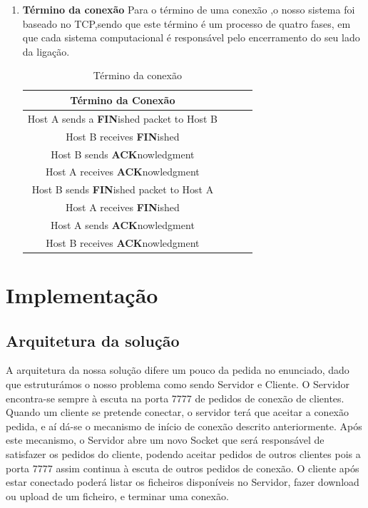 \documentclass{article}
\begin{document}
\begin{enumerate}
\item \textbf{Término da conexão}
Para o término de uma conexão ,o nosso sistema foi baseado no TCP,sendo que este término
é um processo de quatro fases, em que cada sistema computacional é responsável pelo encerramento do seu 
lado da ligação.\\

\begin{table}[h!]
\centering
\begin{tabular}{||c c c c||} 
\hline
\textbf{Término da Conexão} \\ [0.5ex] 
\hline\hline
Host A sends a \textbf{FIN}ished packet to Host B \\ 
Host B receives  \textbf{FIN}ished  \\
Host B sends  \textbf{ACK}nowledgment\\
Host A receives \textbf{ACK}nowledgment\\
Host B sends \textbf{FIN}ished packet to Host A \\
Host A receives \textbf{FIN}ished\\
Host A sends  \textbf{ACK}nowledgment\\
Host B receives \textbf{ACK}nowledgment  \\
\hline
\end{tabular}
\caption{Término da conexão}
\label{table:2}
\end{table}
\end{enumerate}


\newpage

\section{Implementação}

\subsection{Arquitetura da solução}
A arquitetura da nossa solução difere um pouco da pedida no enunciado, dado que estruturámos o nosso problema como sendo Servidor e Cliente.
O Servidor encontra-se sempre à escuta na porta 7777 de pedidos de conexão de clientes. Quando um cliente se pretende conectar, o servidor
terá que aceitar a conexão pedida, e aí dá-se o mecanismo de início de conexão descrito anteriormente. Após este mecanismo, o Servidor
abre um novo Socket que será responsável de satisfazer os pedidos do cliente, podendo aceitar pedidos de outros clientes pois a porta 7777 
assim continua à escuta de outros pedidos de conexão. O cliente após estar conectado poderá listar os ficheiros disponíveis no Servidor, fazer download
ou upload de um ficheiro, e terminar uma conexão. 
\end{document}
